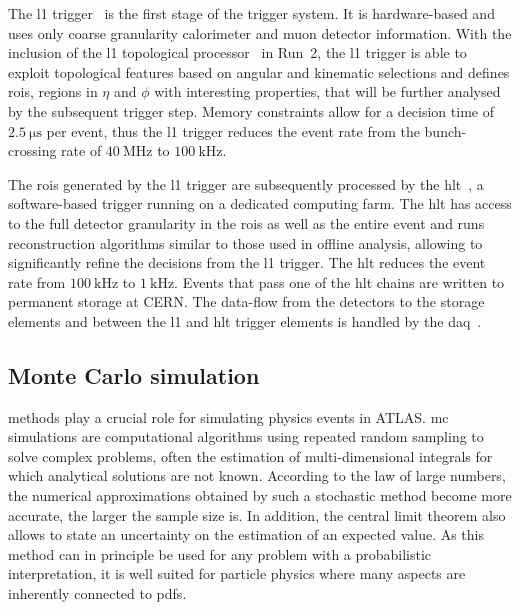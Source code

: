 The \gls{l1} trigger~\cite{CERN-LHCC-98-014} is the first stage of the trigger system. It is hardware-based and uses only coarse granularity calorimeter and muon detector information. With the inclusion of the \gls{l1} topological processor~\cite{Aad:2020wji} in Run~2, the \gls{l1} trigger is able to exploit topological features based on angular and kinematic selections and defines \glspl{roi}, \ie regions in $\eta$ and $\phi$ with interesting properties, that will be further analysed by the subsequent trigger step. Memory constraints allow for a decision time of $\SI{2.5}{\micro\second}$ per event, thus the \gls{l1} trigger reduces the event rate from the bunch-crossing rate of $\SI{40}{\MHz}$ to $\SI{100}{\kHz}$. 

The \glspl{roi} generated by the \gls{l1} trigger are subsequently processed by the \gls{hlt}~\cite{Jenni:616089}, a software-based trigger running on a dedicated computing farm. The \gls{hlt} has access to the full detector granularity in the \glspl{roi} as well as the entire event and runs reconstruction algorithms similar to those used in offline analysis, allowing to significantly refine the decisions from the \gls{l1} trigger. The \gls{hlt} reduces the event rate from $\SI{100}{\kHz}$ to $\SI{1}{\kHz}$. Events that pass one of the \gls{hlt} chains are written to permanent storage at CERN. The data-flow from the detectors to the storage elements and between the \gls{l1} and \gls{hlt} trigger elements is handled by the \gls{daq}~\cite{Jenni:616089}.


\subsection{Monte Carlo simulation}\label{sec:mc_simulation}

 methods play a crucial role for simulating physics events in ATLAS. \gls{mc} simulations are computational algorithms using repeated random sampling to solve complex problems, often the estimation of multi-dimensional integrals for which analytical solutions are not known. According to the law of large numbers, the numerical approximations obtained by such a stochastic method become more accurate, the larger the sample size is. In addition, the central limit theorem also allows to state an uncertainty on the estimation of an expected value. As this method can in principle be used for any problem with a probabilistic interpretation, it is well suited for particle physics where many aspects are inherently connected to \glspl{pdf}. 

